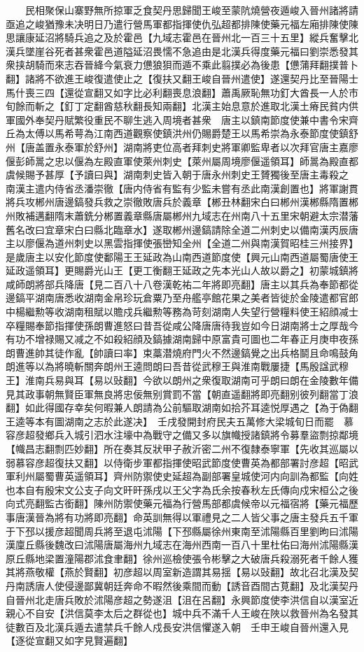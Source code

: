 　　民相聚保山寨野無所掠軍乏食契丹思歸聞王峻至蒙阬燒營夜遁峻入晉州諸將請亟追之峻猶豫未决明日乃遣行營馬軍都指揮使仇弘超都排陳使藥元福左廂排陳使陳思讓康延沼將騎兵追之及於霍邑【九域志霍邑在晉州北一百三十五里】縱兵奮擊北漢兵墜崖谷死者甚衆霍邑道隘延沼畏懦不急追由是北漢兵得度藥元福曰劉崇悉發其衆挟胡騎而來志吞晉絳今氣衰力憊狼狽而遁不乘此翦撲必為後患【憊蒲拜翻撲普卜翻】諸將不欲進王峻復遣使止之【復扶又翻王峻自晉州遣使】遂還契丹比至晉陽士馬什喪三四【還從宣翻又如字比必利翻喪息浪翻】蕭禹厥恥無功釘大酋長一人於市旬餘而斬之【釘丁定翻酋慈秋翻長知兩翻】北漢主始息意於進取北漢土瘠民貧内供軍國外奉契丹賦繁役重民不聊生逃入周境者甚衆　唐主以鎮南節度使兼中書令宋齊丘為太傅以馬希萼為江南西道觀察使鎮洪州仍賜爵楚王以馬希崇為永泰節度使鎮舒州【唐盖置永泰軍於舒州】湖南將吏位高者拜刺史將軍卿監卑者以次拜官唐主嘉廖偃彭師暠之忠以偃為左殿直軍使萊州刺史【萊州屬周境廖偃遥領耳】師暠為殿直都虞候賜予甚厚【予讀曰與】湖南刺史皆入朝于唐永州刺史王贇獨後至唐主毒殺之　南漢主遣内侍省丞潘崇徹【唐内侍省有監有少監未嘗有丞此南漢創置也】將軍謝貫將兵攻郴州唐邊鎬發兵救之崇徹敗唐兵於義章【郴丑林翻宋白曰郴州漢郴縣隋置郴州敗補邁翻隋末蕭銑分郴置義章縣唐屬郴州九域志在州南八十五里宋朝避太宗潜藩舊名改曰宜章宋白曰縣北臨章水】遂取郴州邊鎬請除全道二州刺史以備南漢丙辰唐主以廖偃為道州刺史以黑雲指揮使張巒知全州【全道二州與南漢賀昭桂三州接界】　是歲唐主以安化節度使鄱陽王王延政為山南西道節度使【興元山南西道屬蜀唐使王延政遥領耳】更賜爵光山王【更工衡翻王延政之先本光山人故以爵之】初蒙城鎮將咸師朗將部兵降唐【見二百八十八卷漢乾祐二年將即亮翻】唐主以其兵為奉節都從邊鎬平湖南唐悉收湖南金帛珍玩倉粟乃至舟艦亭館花果之美者皆徙於金陵遣都官郎中楊繼勲等收湖南租賦以贍戍兵繼勲等務為苛刻湖南人失望行營糧料使王紹顔减士卒糧賜奉節指揮使孫朗曹進怒曰昔吾從咸公降唐唐待我豈如今日湖南將士之厚哉今有功不增禄賜又减之不如殺紹顔及鎬據湖南歸中原富貴可圖也二年春正月庚申夜孫朗曹進帥其徒作亂【帥讀曰率】束藁潜燒府門火不然邊鎬覺之出兵格鬬且命鳴鼓角朗進等以為將曉斬關奔朗州王逵問朗曰吾昔從武穆王與淮南戰屢捷【馬殷諡武穆王】淮南兵易與耳【易以䜴翻】今欲以朗州之衆復取湖南可乎朗曰朗在金陵數年備見其政事朝無賢臣軍無良將忠佞無别賞罰不當【朝直遥翻將即亮翻别彼列翻當丁浪翻】如此得國存幸矣何暇兼人朗請為公前驅取湖南如拾芥耳逵悦厚遇之【為于偽翻王逵等本有圖湖南之志於此遂决】　壬戌發開封府民夫五萬修大梁城旬日而罷　慕容彦超發鄉兵入城引泗水注壕中為戰守之備又多以旗幟授諸鎮將令募羣盜剽掠鄰境【幟昌志翻剽匹妙翻】所在奏其反狀甲子赦沂密二州不復隸泰寧軍【先收其巡屬以弱慕容彦超復扶又翻】以侍衛步軍都指揮使昭武節度使曹英為都部署討彦超【昭武軍利州屬蜀曹英遥領耳】齊州防禦使史延超為副部署皇城使河内向訓為都監【向姓也本自有殷宋文公支子向文旰旰孫戌以王父字為氏余按春秋左氏傳向戍宋桓公之後向式亮翻監古銜翻】陳州防禦使藥元福為行營馬部都虞候帝以元福宿將【藥元福歷事唐漢晉為將有功將即亮翻】命英訓無得以軍禮見之二人皆父事之唐主發兵五千軍于下邳以援彦超聞周兵將至退屯沭陽【下邳縣屬徐州東南至沭陽縣百里劉昫曰沭陽漢廩丘縣後魏改曰沭陽唐屬海州九域志在海州西南一百八十里杜佑曰海州沭陽縣漢原丘縣地梁置潼陽郡沭食聿翻】徐州巡檢使張令彬擊之大破唐兵殺溺死者千餘人獲其將燕敬權【燕於賢翻】初彦超以周室新造謂其易揺【易以䜴翻】故北召北漢及契丹南誘唐人使侵邊鄙冀朝廷奔命不暇然後乘間而動【誘音酉間古莧翻】及北漢契丹自晉州北走唐兵敗於沭陽彦超之勢遂沮【沮在呂翻】永興節度使李洪信自以漢室近親心不自安【洪信莫李太后之群從也】城中兵不滿千人王峻在陜以救晉州為名發其徒數百及北漢兵遁去遣禁兵千餘人戍長安洪信懼遂入朝　壬申王峻自晉州還入見【逐從宣翻又如字見賢遍翻】
